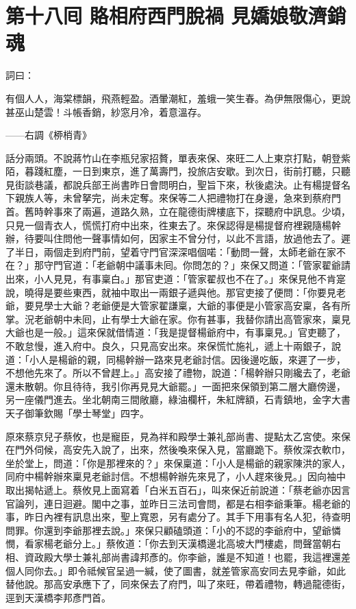 
\chapter*{第十八囘 賂相府西門脫禍 見嬌娘敬濟銷魂}


詞曰：

有個人人，海棠標韻，飛燕輕盈。酒暈潮紅，羞蛾一笑生春。為伊無限傷心，更說甚巫山楚雲！斗帳香銷，紗窓月冷，着意溫存。

——右調《桺梢青》

話分兩頭。不說蔣竹山在李瓶兒家招贅，單表來保、來旺二人上東京打點，朝登紫陌，暮踐紅塵，一日到東京，進了萬壽門，投旅店安歇。到次日，街前打聽，只聽見街談巷議，都說兵部王尚書昨日會問明白，聖旨下來，秋後處決。止有楊提督名下親族人等，未曾拏完，尚未定奪。來保等二人把禮物打在身邊，急來到蔡府門首。舊時幹事來了兩遍，道路久熟，立在龍德街牌樓底下，探聽府中訊息。少頃，只見一個青衣人，慌慌打府中出來，徃東去了。來保認得是楊提督府裡親隨楊幹辦，待要叫住問他一聲事情如何，因家主不曾分付，以此不言語，放過他去了。遲了半日，兩個走到府門前，望着守門官深深唱個喏：「動問一聲，太師老爺在家不在？」那守門官道：「老爺朝中議事未囘。你問怎的？」來保又問道：「管家翟爺請出來，小人見見，有事稟白。」那官吏道：「管家翟叔也不在了。」來保見他不肯寔說，曉得是要些東西，就袖中取出一兩銀子遞與他。那官吏接了便問：「你要見老爺，要見學士大爺？老爺便是大管家翟謙稟，大爺的事便是小管家高安稟，各有所掌。況老爺朝中未囘，{}止有學士大爺在家。你有甚事，我替你請出高管家來，稟見大爺也是一般。」這來保就借情道：「我是提督楊爺府中，有事稟見。」官吏聽了，不敢怠慢，進入府中。良久，只見高安出來。來保慌忙施礼，遞上十兩銀子，說道：「小人是楊爺的親，同楊幹辦一路來見老爺討信。因後邊吃飯，來遲了一步，不想他先來了。所以不曾趕上。」高安接了禮物，說道：「楊幹辦只剛纔去了，老爺還未散朝。你且待待，我引你再見見大爺罷。」一面把來保領到第二層大廳傍邊，另一座儀門進去。坐北朝南三間敞廳，綠油欄杆，朱紅牌額，石青鎮地，金字大書天子御筆欽賜「學士琴堂」四字。

原來蔡京兒子蔡攸，也是寵臣，見為祥和殿學士兼礼部尚書、提點太乙宮使。來保在門外伺候，高安先入說了，出來，然後喚來保入見，當廳跪下。蔡攸深衣軟巾，坐於堂上，問道：「你是那裡來的？」來保稟道：「小人是楊爺的親家陳洪的家人，同府中楊幹辦來稟見老爺討信。不想楊幹辦先來見了，小人趕來後見。」因向袖中取出揭帖遞上。蔡攸見上面寫着「白米五百石」，叫來保近前說道：「蔡老爺亦因言官論列，連日迴避。閣中之事，並昨日三法司會問，都是右相李爺秉筆。楊老爺的事，昨日內裡有訊息出來，聖上寬恩，另有處分了。其手下用事有名人犯，待查明問罪。你還到李爺那裡去說。」來保只顧磕頭道：「小的不認的李爺府中，望爺憐憫，看家楊老爺分上。」蔡攸道：「你去到天漢橋邊北高坡大門樓處，問聲當朝右相、資政殿大學士兼礼部尚書諱邦彥的。{}你李爺，誰是不知道！也罷，我這裡還差個人同你去。」即令祗候官呈過一緘，使了圖書，就差管家高安同去見李爺，如此替他說。那高安承應下了，同來保去了府門，叫了來旺，帶着禮物，轉過龍德街，逕到天漢橋李邦彥門首。

